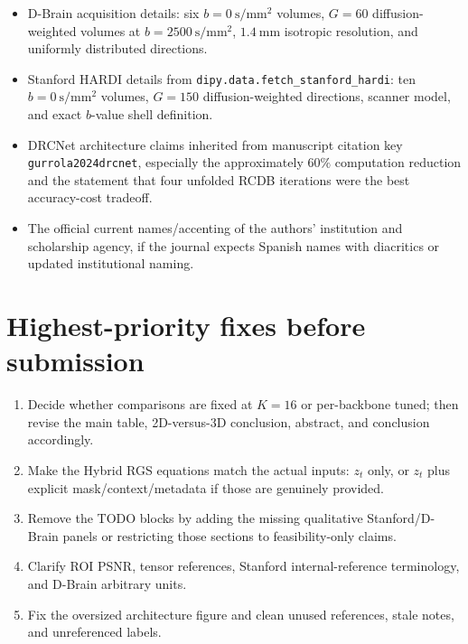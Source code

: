 \documentclass[11pt]{article}
\begin{document}
\begin{itemize}
  \item D-Brain acquisition details: six $b=0~\mathrm{s/mm^2}$ volumes, $G=60$ diffusion-weighted volumes at $b=2500~\mathrm{s/mm^2}$, $1.4~\mathrm{mm}$ isotropic resolution, and uniformly distributed directions.
  \item Stanford HARDI details from \texttt{dipy.data.fetch\_stanford\_hardi}: ten $b=0~\mathrm{s/mm^2}$ volumes, $G=150$ diffusion-weighted directions, scanner model, and exact $b$-value shell definition.
  \item DRCNet architecture claims inherited from manuscript citation key \texttt{gurrola2024drcnet}, especially the approximately $60\%$ computation reduction and the statement that four unfolded RCDB iterations were the best accuracy-cost tradeoff.
  \item The official current names/accenting of the authors' institution and scholarship agency, if the journal expects Spanish names with diacritics or updated institutional naming.
\end{itemize}

\section*{Highest-priority fixes before submission}

\begin{enumerate}
  \item Decide whether comparisons are fixed at $K=16$ or per-backbone tuned; then revise the main table, 2D-versus-3D conclusion, abstract, and conclusion accordingly.
  \item Make the Hybrid RGS equations match the actual inputs: $z_t$ only, or $z_t$ plus explicit mask/context/metadata if those are genuinely provided.
  \item Remove the TODO blocks by adding the missing qualitative Stanford/D-Brain panels or restricting those sections to feasibility-only claims.
  \item Clarify ROI PSNR, tensor references, Stanford internal-reference terminology, and D-Brain arbitrary units.
  \item Fix the oversized architecture figure and clean unused references, stale notes, and unreferenced labels.
\end{enumerate}
\end{document}
